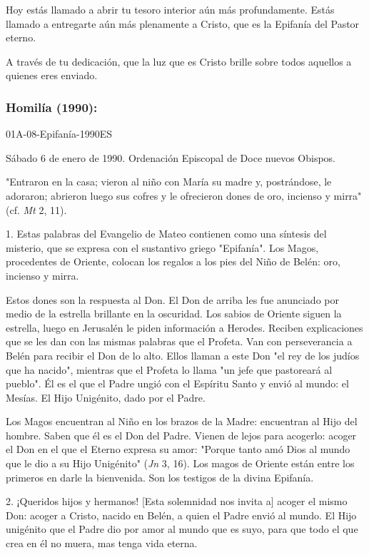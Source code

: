 \begin{body}
Hoy estás llamado a abrir tu tesoro interior aún más profundamente. Estás llamado a entregarte aún más plenamente a Cristo, que es la Epifanía del Pastor eterno.

A través de tu dedicación, que la luz que es Cristo brille sobre todos aquellos a quienes eres enviado.

\subsubsection{Homilía (1990): } 01A-08-Epifanía-1990ES

Sábado 6 de enero de 1990. Ordenación Episcopal de Doce nuevos Obispos.

"Entraron en la casa; vieron al niño con María su madre y, postrándose, le adoraron; abrieron luego sus cofres y le ofrecieron dones de oro, incienso y mirra" (cf. \emph{Mt} 2, 11).

1. Estas palabras del Evangelio de Mateo contienen como una síntesis del misterio, que se expresa con el sustantivo griego "Epifanía". Los Magos, procedentes de Oriente, colocan los regalos a los pies del Niño de Belén: oro, incienso y mirra.

Estos dones son la respuesta al Don. El Don de arriba les fue anunciado por medio de la estrella brillante en la oscuridad. Los sabios de Oriente siguen la estrella, luego en Jerusalén le piden información a Herodes. Reciben explicaciones que se les dan con las mismas palabras que el Profeta. Van con perseverancia a Belén para recibir el Don de lo alto. Ellos llaman a este Don "el rey de los judíos que ha nacido", mientras que el Profeta lo llama "un jefe que pastoreará al pueblo". Él es el que el Padre ungió con el Espíritu Santo y envió al mundo: el Mesías. El Hijo Unigénito, dado por el Padre.

Los Magos encuentran al Niño en los brazos de la Madre: encuentran al Hijo del hombre. Saben que él es el Don del Padre. Vienen de lejos para acogerlo: acoger el Don en el que el Eterno expresa su amor: "Porque tanto amó Dios al mundo que le dio a su Hijo Unigénito" (\emph{Jn} 3, 16). Los magos de Oriente están entre los primeros en darle la bienvenida. Son los testigos de la divina Epifanía.

2. ¡Queridos hijos y hermanos! {[}Esta solemnidad nos invita a{]} acoger el mismo Don: acoger a Cristo, nacido en Belén, a quien el Padre envió al mundo. El Hijo unigénito que el Padre dio por amor al mundo que es suyo, para que todo el que crea en él no muera, mas tenga vida eterna.


\end{body}
